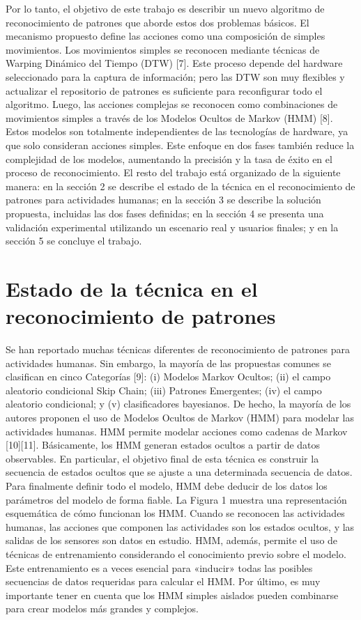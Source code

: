 \documentclass[a4paper]{article}
\begin{document}
Por lo tanto, el objetivo de este trabajo es describir un nuevo algoritmo de reconocimiento de patrones que aborde estos dos problemas básicos. El mecanismo propuesto define las acciones como una composición de simples movimientos. Los movimientos simples se reconocen mediante técnicas de Warping Dinámico del Tiempo (DTW) [7]. Este proceso depende del hardware seleccionado para la captura de información; pero las DTW son muy flexibles y actualizar el repositorio de patrones es suficiente para reconfigurar todo el algoritmo. Luego, las acciones complejas se reconocen como combinaciones de movimientos simples a través de los Modelos Ocultos de Markov (HMM) [8]. Estos modelos son totalmente independientes de las tecnologías de hardware, ya que solo consideran acciones simples. Este enfoque en dos fases también reduce la complejidad de los modelos, aumentando la precisión y la tasa de éxito en el proceso de reconocimiento.
El resto del trabajo está organizado de la siguiente manera: en la sección 2 se describe el estado de la técnica en el reconocimiento de patrones para actividades humanas; en la sección 3 se describe la solución propuesta, incluidas las dos fases definidas; en la sección 4 se presenta una validación experimental utilizando un escenario real y usuarios finales; y en la sección 5 se concluye el trabajo.

\section{Estado de la técnica en el reconocimiento de patrones}

Se han reportado muchas técnicas diferentes de reconocimiento de patrones para actividades humanas. Sin embargo, la mayoría de las propuestas comunes se clasifican en cinco
Categorías [9]: (i) Modelos Markov Ocultos; (ii) el campo aleatorio condicional Skip Chain; (iii) Patrones Emergentes; (iv) el campo aleatorio condicional; y (v) clasificadores bayesianos.
De hecho, la mayoría de los autores proponen el uso de Modelos Ocultos de Markov (HMM) para modelar las actividades humanas. HMM permite modelar acciones como cadenas de Markov [10][11]. Básicamente, los HMM generan estados ocultos a partir de datos observables. En particular, el objetivo final de esta técnica es construir la secuencia de estados ocultos que se ajuste a una determinada secuencia de datos. Para finalmente definir todo el modelo, HMM debe deducir de los datos los parámetros del modelo de forma fiable. La Figura 1 muestra una representación esquemática de cómo funcionan los HMM. Cuando se reconocen las actividades humanas, las acciones que componen las actividades son los estados ocultos, y las salidas de los sensores son datos en estudio. HMM, además, permite el uso de técnicas de entrenamiento considerando el conocimiento previo sobre el modelo. Este entrenamiento es a veces esencial para «inducir» todas las posibles secuencias de datos requeridas para calcular el HMM. Por último, es muy importante tener en cuenta que los HMM simples aislados pueden combinarse para crear modelos más grandes y complejos.
\end{document}
